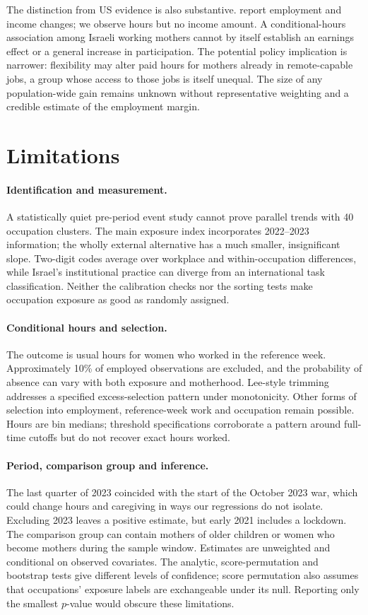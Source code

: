 \documentclass[12pt,a4paper]{article}
\begin{document}
The distinction from US evidence is also substantive. \citet{harrington2025} report employment and income changes; we observe hours but no income amount. A conditional-hours association among Israeli working mothers cannot by itself establish an earnings effect or a general increase in participation. The potential policy implication is narrower: flexibility may alter paid hours for mothers already in remote-capable jobs, a group whose access to those jobs is itself unequal. The size of any population-wide gain remains unknown without representative weighting and a credible estimate of the employment margin.

\section{Limitations}\label{sec:limitations}
\paragraph{Identification and measurement.} A statistically quiet pre-period event study cannot prove parallel trends with 40 occupation clusters. The main exposure index incorporates 2022--2023 information; the wholly external alternative has a much smaller, insignificant slope. Two-digit codes average over workplace and within-occupation differences, while Israel's institutional practice can diverge from an international task classification. Neither the calibration checks nor the sorting tests make occupation exposure as good as randomly assigned.

\paragraph{Conditional hours and selection.} The outcome is usual hours for women who worked in the reference week. Approximately 10\% of employed observations are excluded, and the probability of absence can vary with both exposure and motherhood. Lee-style trimming addresses a specified excess-selection pattern under monotonicity. Other forms of selection into employment, reference-week work and occupation remain possible. Hours are bin medians; threshold specifications corroborate a pattern around full-time cutoffs but do not recover exact hours worked.

\paragraph{Period, comparison group and inference.} The last quarter of 2023 coincided with the start of the October 2023 war, which could change hours and caregiving in ways our regressions do not isolate. Excluding 2023 leaves a positive estimate, but early 2021 includes a lockdown. The comparison group can contain mothers of older children or women who become mothers during the sample window. Estimates are unweighted and conditional on observed covariates. The analytic, score-permutation and bootstrap tests give different levels of confidence; score permutation also assumes that occupations' exposure labels are exchangeable under its null. Reporting only the smallest $p$-value would obscure these limitations.
\end{document}
